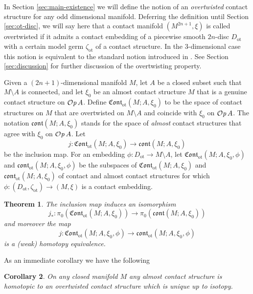 \documentclass[12pt]{paper}
\theoremstyle{plain}
\newtheorem{theorem}{Theorem}[section]
\newtheorem{corollary}[theorem]{Corollary}
\theoremstyle{definition}
\newcommand{\Cont}{\mathfrak{Cont}}
\newcommand{\cont}{\mathfrak{cont}}
\newcommand{\ot}{\mathrm{ot}}
\def\Op{{\mathcal O}{\it p}\,}
\numberwithin{figure}{section}
\begin{document}
  
    
    In Section \ref{sec:main-existence} we will define the notion of an {\em overtwisted} contact structure
    for any odd dimensional manifold.   Deferring the definition until Section \ref{sec:ot-disc}, we will say here that a contact manifold $(M^{2n+1},\xi)$ is called overtwisted if it admits a contact embedding of a piecewise smooth $2n$-disc $D_\ot$ with a certain model germ $\zeta_\ot$ of a contact structure.
      In the $3$-dimensional case this notion is equivalent  to the standard notion introduced in \cite{Eli89}. 
See Section \ref{sec:discussion} for further discussion of the overtwisting property.

 

Given a $(2n+1)$-dimensional manifold $M$, let $A$ be a closed subset such that $M \setminus A$ is connected, and let $\xi_0$ be an almost contact structure $M$
that is a genuine contact structure on $\Op A$.  Define
$\Cont_\ot(M;A,\xi_0)$ to be the space of contact structures on $M$ that are overtwisted on $M\setminus A$ and coincide with 
$\xi_0$ on $\Op A$.
The notation   $\cont(M;A,\xi_0)$ stands for the space of {\em almost} contact structures
that agree with $\xi_0$ on $\Op A$. Let 
$$j:\Cont_\ot(M;A,\xi_0)\to\cont(M;A,\xi_0)$$  be  the inclusion map.
For an embedding $\phi:D_\ot\to M\setminus A$, let 
$\Cont_\ot(M;A,\xi_0,\phi)$ and $\cont_\ot(M;A,\xi_0,\phi)$ be the subspaces
   of  $\Cont_\ot(M;A,\xi_0)$ and $\cont_{\ot}(M;A,\xi_0)$ of contact and almost contact structures for which 
   $\phi:(D_\ot,\zeta_\ot)\to(M,\xi)$ is a contact embedding.
   
\begin{theorem}\label{thm:main}
 The inclusion map induces an isomorphism
 $$j_*:\pi_0(\Cont_\ot(M;A,\xi_0))\to\pi_0(\cont(M;A,\xi_0))$$
 and moreover the map
 $$j:\Cont_\ot(M;A,\xi_0,\phi)\to\cont_\ot(M;A,\xi_0,\phi)$$ is a (weak) homotopy  equivalence. 
 \end{theorem}
 
 As an immediate corollary we have the following
  
  \begin{corollary}\label{cor:main}
  On any closed manifold $M$ any almost contact structure is homotopic to an overtwisted contact structure which is unique up to isotopy. 
  \end{corollary}
  
\end{document}
